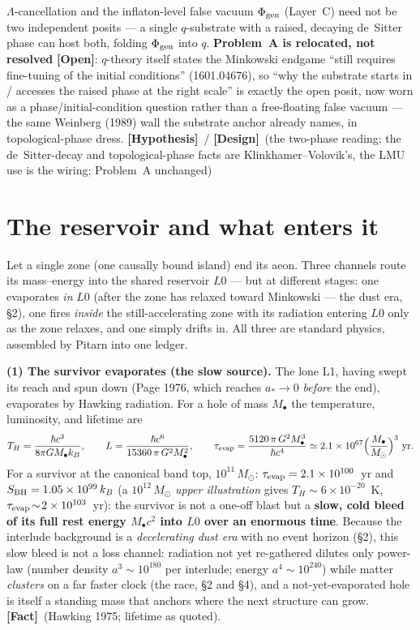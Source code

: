\documentclass[11pt]{article}
\newcommand{\Fact}{\textbf{\textcolor{green!45!black}{[Fact]}}}
\newcommand{\Hyp}{\textbf{\textcolor{blue!55!black}{[Hypothesis]}}}
\newcommand{\Design}{\textbf{\textcolor{purple!65!black}{[Design]}}}
\newcommand{\Open}{\textbf{\textcolor{gray!10!black}{[Open]}}}
\newcommand{\msun}{M_\odot}
\newcommand{\Mbh}{M_{\bullet}}
\begin{document}
$\Lambda$-cancellation and the inflaton-level false vacuum $\Phi_{\rm gen}$ (Layer~C) need not be two independent posits --- a single $q$-substrate with a raised, decaying de~Sitter phase can host both, folding $\Phi_{\rm gen}$ into $q$. \textbf{Problem~A is relocated, not resolved} \Open: $q$-theory itself states the Minkowski endgame ``still requires fine-tuning of the initial conditions'' (1601.04676), so ``why the substrate starts in / accesses the raised phase at the right scale'' is exactly the open posit, now worn as a phase/initial-condition question rather than a free-floating false vacuum --- the same Weinberg (1989) wall the substrate anchor already names, in topological-phase dress. \Hyp\ / \Design\ (the two-phase reading; the de~Sitter-decay and topological-phase facts are Klinkhamer--Volovik's, the LMU use is the wiring; Problem~A unchanged)

\section{The reservoir and what enters it}
Let a single zone (one causally bound island) end its aeon. Three channels route its mass--energy into the shared reservoir $L0$ --- but at different stages: one evaporates \emph{in} $L0$ (after the zone has relaxed toward Minkowski --- the dust era, \S2), one fires \emph{inside} the still-accelerating zone with its radiation entering $L0$ only as the zone relaxes, and one simply drifts in. All three are standard physics, assembled by Pitarn into one ledger.

\textbf{(1) The survivor evaporates (the slow source).} The lone L1, having swept its reach and spun down (Page 1976, which reaches $a_\ast\!\to\!0$ \emph{before} the end), evaporates by Hawking radiation. For a hole of mass $\Mbh$ the temperature, luminosity, and lifetime are
\begin{equation}
T_H=\frac{\hbar c^3}{8\pi G \Mbh k_B},\qquad
L=\frac{\hbar c^6}{15360\,\pi\,G^2 \Mbh^2},\qquad
\tau_{\rm evap}=\frac{5120\,\pi\,G^2 \Mbh^3}{\hbar c^4}\simeq 2.1\times10^{67}\Big(\frac{\Mbh}{\msun}\Big)^{3}\ {\rm yr}.
\label{eq:hawking}
\end{equation}
For a survivor at the canonical band top, $10^{11}\,\msun$: $\tau_{\rm evap}=2.1\times10^{100}$~yr and $S_{\rm BH}=1.05\times10^{99}\,k_B$ (a $10^{12}\,\msun$ \emph{upper illustration} gives $T_H\!\sim\!6\times10^{-20}$~K, $\tau_{\rm evap}\!\sim\!2\times10^{103}$~yr): the survivor is not a one-off blast but a \textbf{slow, cold bleed of its full rest energy $\Mbh c^2$ into $L0$ over an enormous time}. Because the interlude background is a \emph{decelerating dust era} with no event horizon (\S2), this slow bleed is not a loss channel: radiation not yet re-gathered dilutes only power-law (number density $a^3\sim10^{180}$ per interlude; energy $a^4\sim10^{240}$) while matter \emph{clusters} on a far faster clock (the race, \S2 and \S4), and a not-yet-evaporated hole is itself a standing mass that anchors where the next structure can grow. \Fact\ (Hawking 1975; lifetime as quoted).
\end{document}
